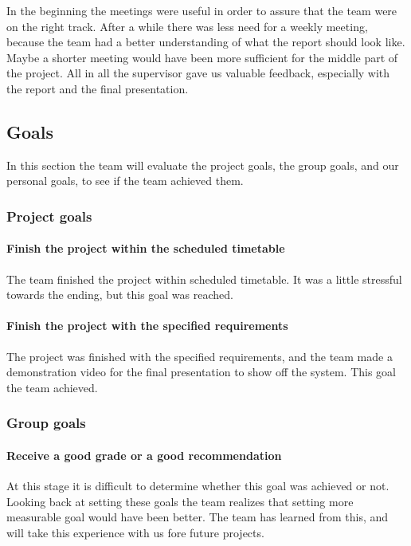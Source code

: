 In the beginning the meetings were useful in order to assure that the team were on the right track. After a while there was less need for a weekly meeting, because the team had a better understanding of what the report should look like.
Maybe a shorter meeting would have been more sufficient for the middle part of the project. All in all the supervisor gave us valuable feedback, especially with the report and the final presentation. 


\subsection{Goals} 
In this section the team will evaluate the project goals, the group goals, and our personal goals, to see if the team achieved them. 

\subsubsection{Project goals}
\paragraph{Finish the project within the scheduled timetable}
The team finished the project within scheduled timetable. It was a little stressful towards the ending, but this goal was reached.
\paragraph{Finish the project with the specified requirements}
The project was finished with the specified requirements, and the team made a demonstration video for the final presentation to show off the system. This goal the team achieved. 

\subsubsection{Group goals}
\paragraph{Receive a good grade or a good recommendation}
At this stage it is difficult to determine whether this goal was achieved or not. Looking back at setting these goals the team realizes that setting more measurable goal would have been better. The team has learned from this, and will take this experience with us fore future projects.

